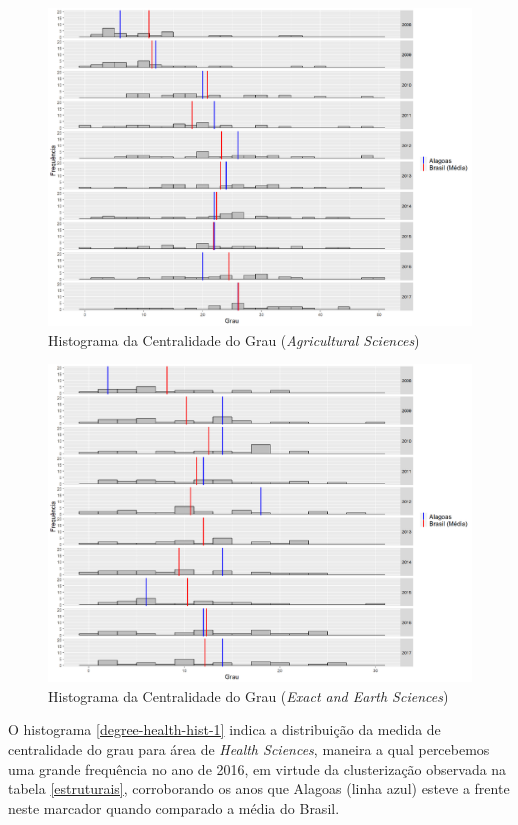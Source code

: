 \begin{figure}[H]
	\centering
	\includegraphics[scale=0.5]{Imagens/agricultural/degree-hist.pdf}
	\caption{Histograma da Centralidade do Grau (\textit{Agricultural Sciences})}
	\label{degree-agri-hist-1}
\end{figure}

\begin{figure}[H]
	\centering
	\includegraphics[scale=0.5]{Imagens/exact/degree-hist.pdf}
	\caption{Histograma da Centralidade do Grau (\textit{Exact and Earth Sciences})}
	\label{degree-exact-hist-1}
\end{figure}


O histograma \ref{degree-health-hist-1} indica a distribuição da medida de centralidade do grau para área de \textit{Health Sciences}, maneira a qual percebemos uma grande frequência no ano de 2016, em virtude da clusterização observada na tabela \ref{estruturais}, corroborando os anos que Alagoas (linha azul) esteve a frente neste marcador quando comparado a média do Brasil.

